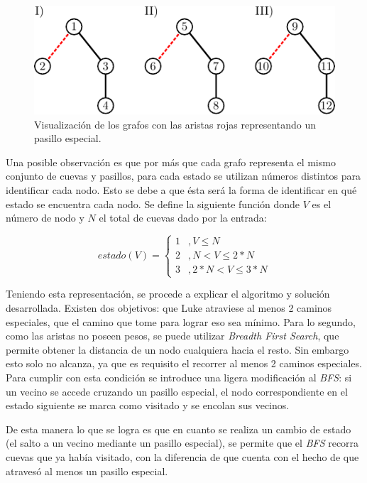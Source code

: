 	\begin{figure}[H]
		\centering
		\includegraphics{imagenes/ej1_modelo_1.pdf}
		\caption{Visualización de los grafos con las aristas rojas representando un pasillo especial.}
		\label{ej1:fig_1}
	\end{figure}

	Una posible observación es que por más que cada grafo representa el mismo
	conjunto de cuevas y pasillos, para cada estado se utilizan
	números distintos para identificar cada nodo. Esto se debe a que ésta será
	la forma de identificar en qué estado se encuentra cada nodo. Se define la
	siguiente función donde $V$ es el número de nodo y $N$ el total de cuevas
	dado por la entrada:

	\begin{equation*}
		estado(V) =
		\begin{cases}
			1 & , V \leq N \\
			2 & , N < V \leq 2 * N \\
			3 & , 2 * N < V \leq 3 * N
		\end{cases}
	\end{equation*}

	Teniendo esta representación, se procede a explicar el algoritmo y
	solución desarrollada. Existen dos objetivos: que Luke atraviese al menos 2
	caminos especiales, que el camino que tome para lograr eso sea mínimo. Para
	lo segundo, como las aristas no poseen pesos, se puede utilizar
	\emph{Breadth First Search}, que permite obtener la distancia de un nodo
	cualquiera hacia el resto. Sin embargo esto solo no alcanza, ya que es
	requisito el recorrer al menos 2 caminos especiales. Para cumplir con esta
	condición se introduce una ligera modificación al \emph{BFS}: si un vecino
	se accede cruzando un pasillo especial, el nodo correspondiente en el estado
	siguiente se marca como visitado y se encolan sus vecinos.

	De esta manera lo que se logra es que en cuanto se realiza un cambio de
	estado (el salto a un vecino mediante un pasillo especial), se permite que
	el \emph{BFS} recorra cuevas que ya había visitado, con la diferencia de que
	cuenta con el hecho de que atravesó al menos un pasillo especial.

